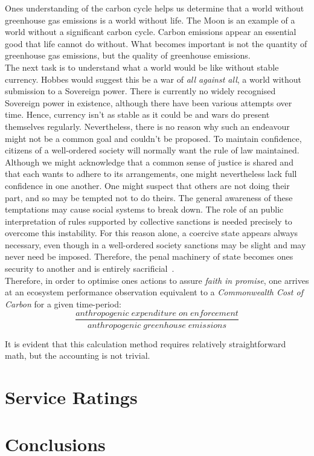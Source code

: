 \documentclass[11pt, oneside]{article}   	%
\begin{document}
Ones understanding of the carbon cycle helps us determine that a world without greenhouse gas emissions is a world without life.
The Moon is an example of a world without a significant carbon cycle.
Carbon emissions appear an essential good that life cannot do without.
What becomes important is not the quantity of greenhouse gas emissions, but the quality of greenhouse emissions.\\

The next task is to understand what a world would be like without stable currency.
Hobbes would suggest this be a war of \emph{all against all}, a world without submission to a Sovereign power.
There is currently no widely recognised Sovereign power in existence, although there have been various attempts over time.
Hence, currency isn't as stable as it could be and wars do present themselves regularly.
Nevertheless, there is no reason why such an endeavour might not be a common goal and couldn't be proposed.
To maintain confidence, citizens of a well-ordered society will normally want the rule of law maintained.
Although we might acknowledge that a common sense of justice is shared and that each wants to adhere to its arrangements, one might nevertheless lack full confidence in one another.
One might suspect that others are not doing their part, and so may be tempted not to do theirs.
The general awareness of these temptations may cause social systems to break down.
The role of an public interpretation of rules supported by collective sanctions is needed precisely to overcome this instability.
For this reason alone, a coercive state appears always necessary, even though in a well-ordered society sanctions may be slight and may never need be imposed.
Therefore, the penal machinery of state becomes ones security to another and is entirely sacrificial~\cite{jr1}.\\

Therefore, in order to optimise ones actions to assure \emph{faith in promise}, one arrives at an ecosystem performance observation equivalent to a \emph{Commonwealth Cost of Carbon} for a given time-period:\\

\begin{equation}
	\frac{anthropogenic\; expenditure\; on\; enforcement}{anthropogenic\; greenhouse\; emissions}
\end{equation}

It is evident that this calculation method requires relatively straightforward math, but the accounting is not trivial.\\


\section{Service Ratings}


\section{Conclusions}
\end{document}
